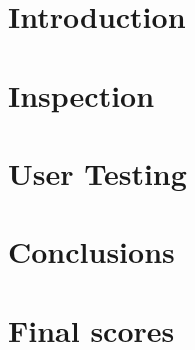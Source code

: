 \documentclass[10pt]{report}
\begin{document}

\restoregeometry

\setcounter{tocdepth}{5}
\tableofcontents
\listoffigures
\listoftables

\justify

\chapter{Introduction}

\pagebreak

\chapter{Inspection}

\pagebreak

\chapter{User Testing}

\pagebreak

\chapter{Conclusions}

\pagebreak

\appendix
\chapter{Final scores}

\pagebreak

\printbibliography
\end{document}
